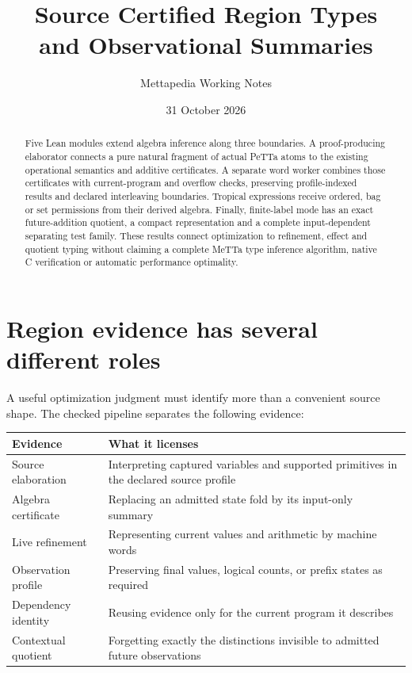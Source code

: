 \documentclass[11pt,a4paper]{article}
\title{Source Certified Region Types\\and Observational Summaries}
\author{Mettapedia Working Notes}
\date{31 October 2026}
\begin{document}
\maketitle
\begin{abstract}
Five Lean modules extend algebra inference along three boundaries. A
proof-producing elaborator connects a pure natural fragment of actual PeTTa
atoms to the existing operational semantics and additive certificates. A
separate word worker combines those certificates with current-program and
overflow checks, preserving profile-indexed results and declared interleaving
boundaries. Tropical expressions receive ordered, bag or set permissions from
their derived algebra. Finally, finite-label mode has an exact future-addition
quotient, a compact representation and a complete input-dependent separating
test family. These results connect optimization to refinement, effect and
quotient typing without claiming a complete MeTTa type inference algorithm,
native C verification or automatic performance optimality.
\end{abstract}

\section{Region evidence has several different roles}

A useful optimization judgment must identify more than a convenient source
shape. The checked pipeline separates the following evidence:

\begin{center}
\begin{tabularx}{\linewidth}{@{}lX@{}}
\toprule
Evidence & What it licenses\\
\midrule
Source elaboration & Interpreting captured variables and supported primitives in the declared source profile\\
Algebra certificate & Replacing an admitted state fold by its input-only summary\\
Live refinement & Representing current values and arithmetic by machine words\\
Observation profile & Preserving final values, logical counts, or prefix states as required\\
Dependency identity & Reusing evidence only for the current program it describes\\
Contextual quotient & Forgetting exactly the distinctions invisible to admitted future observations\\
\bottomrule
\end{tabularx}
\end{center}
\end{document}
